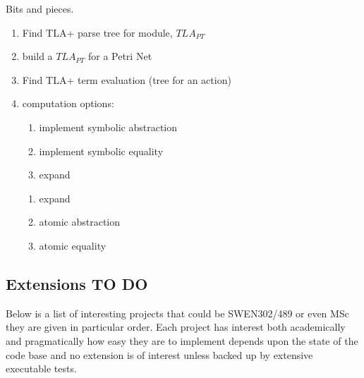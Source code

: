 \documentclass[]{article}
\begin{document}
 
  
Bits and pieces.
  
  \begin{enumerate}
  \item Find TLA+ parse tree for module, $TLA_{PT}$ 
  \item build  a $TLA_{PT}$ for a Petri Net
  \item Find TLA+ term evaluation (tree for an action)
 
 \item computation options:
 
\noindent\begin{center}\begin{minipage}{0.45\textwidth}
\begin{enumerate} 
 \item implement  symbolic abstraction
 \item implement symbolic equality
 \item expand
 \end{enumerate} 
 \end{minipage}
  \begin{minipage}{0.45\textwidth}
 \begin{enumerate}
  \item expand  
  \item atomic abstraction
  \item atomic  equality
  \end{enumerate} 
 \end{minipage}\end{center}
 \end{enumerate}



\subsection{Extensions TO DO}
Below is a list of interesting projects  that could be SWEN302/489  or even MSc they are given in particular order. Each project has interest both academically and pragmatically how easy they are to  implement depends upon the state of the code base and no extension is of interest unless backed up by extensive executable tests.
\end{document}
